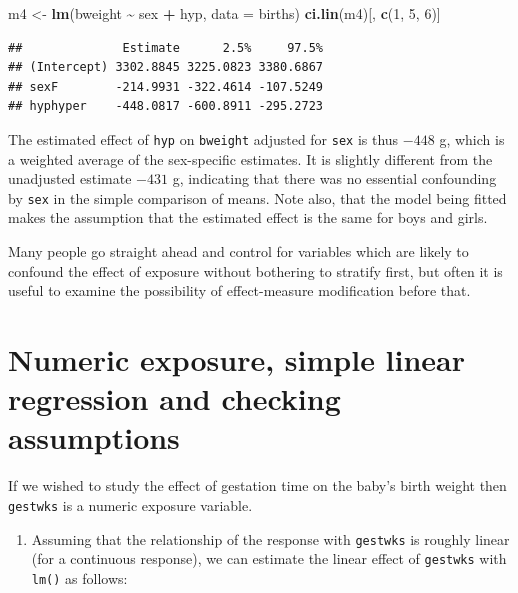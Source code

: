 \documentclass[
]{book}
\newenvironment{Shaded}{\begin{snugshade}}{\end{snugshade}}
\newcommand{\AttributeTok}[1]{\textcolor[rgb]{0.13,0.29,0.53}{#1}}
\newcommand{\DecValTok}[1]{\textcolor[rgb]{0.00,0.00,0.81}{#1}}
\newcommand{\FunctionTok}[1]{\textcolor[rgb]{0.13,0.29,0.53}{\textbf{#1}}}
\newcommand{\NormalTok}[1]{#1}
\newcommand{\OtherTok}[1]{\textcolor[rgb]{0.56,0.35,0.01}{#1}}
\newcommand{\SpecialCharTok}[1]{\textcolor[rgb]{0.81,0.36,0.00}{\textbf{#1}}}
\providecommand{\tightlist}{%
  \setlength{\itemsep}{0pt}\setlength{\parskip}{0pt}}
\theoremstyle{definition}
\theoremstyle{definition}
\theoremstyle{definition}
\theoremstyle{definition}
\theoremstyle{remark}
\begin{document}
\begin{Shaded}
\begin{Highlighting}[]
\NormalTok{m4 }\OtherTok{\textless{}{-}} \FunctionTok{lm}\NormalTok{(bweight }\SpecialCharTok{\textasciitilde{}}\NormalTok{ sex }\SpecialCharTok{+}\NormalTok{ hyp, }\AttributeTok{data =}\NormalTok{ births)}
\FunctionTok{ci.lin}\NormalTok{(m4)[, }\FunctionTok{c}\NormalTok{(}\DecValTok{1}\NormalTok{, }\DecValTok{5}\NormalTok{, }\DecValTok{6}\NormalTok{)]}
\end{Highlighting}
\end{Shaded}

\begin{verbatim}
##              Estimate      2.5%     97.5%
## (Intercept) 3302.8845 3225.0823 3380.6867
## sexF        -214.9931 -322.4614 -107.5249
## hyphyper    -448.0817 -600.8911 -295.2723
\end{verbatim}

The estimated effect of \texttt{hyp} on \texttt{bweight}
adjusted for \texttt{sex} is thus \(-448\) g,
which is a weighted average of the sex-specific estimates.
It is slightly different from the unadjusted estimate \(-431\) g, indicating
that there was no essential confounding by \texttt{sex} in the
simple comparison of means.
Note also, that the model being fitted makes the assumption that
the estimated effect is the same for boys and girls.

Many people go straight ahead and control for variables which are likely to
confound the effect of exposure without bothering to stratify first,
but often it is useful to examine the possibility of effect-measure
modification before that.

\section{Numeric exposure, simple linear regression and checking assumptions}\label{numeric-exposure-simple-linear-regression-and-checking-assumptions}

If we wished to study the effect of gestation time on the baby's birth
weight then \texttt{gestwks} is a numeric exposure variable.

\begin{enumerate}
\def\labelenumi{\arabic{enumi}.}
\tightlist
\item
  Assuming that the relationship
  of the response with \texttt{gestwks} is roughly linear
  (for a continuous response),
  we can estimate the linear effect of \texttt{gestwks} with \texttt{lm()} as follows:
\end{enumerate}
\end{document}
